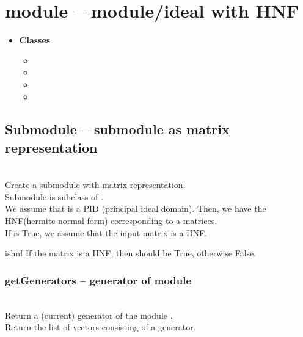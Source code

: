 

 \section{module -- module/ideal with HNF}
 \begin{itemize}
   \item {\bf Classes}
   \begin{itemize}
     \item {}
     \item {}
     \item {}
     \item {}
   \end{itemize}
 \end{itemize}

\C

 \subsection{Submodule -- submodule as matrix representation}
 \initialize
  \\
  \spacing
  \quad Create a submodule with matrix representation.\\
  \spacing
  \quad Submodule is subclass of .\\
  We assume that  is a PID (principal ideal domain).
  Then, we have the HNF(hermite normal form) corresponding to a matrices.\\
  \spacing
  If  is True, we assume that the input matrix is a HNF.
  \begin{at}
   \item[ishnf] If the matrix is a HNF, then  should be True, otherwise False.
  \end{at}
  \method
  \subsubsection{getGenerators -- generator of module}
   \\
   \spacing
   \quad Return a (current) generator of the module .\\
   \spacing
   \quad Return the list of vectors consisting of a generator.\\
